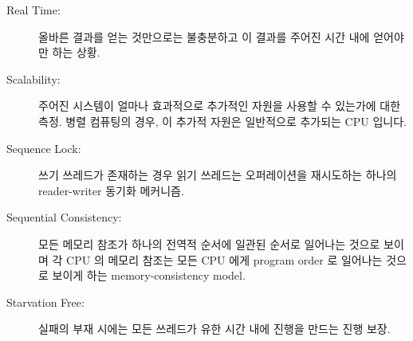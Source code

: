 \begin{description}
\fi

\item[Real Time:]
	올바른 결과를 얻는 것만으로는 불충분하고 이 결과를 주어진 시간 내에
	얻어야만 하는 상황.
\item[Scalability:]
	주어진 시스템이 얼마나 효과적으로 추가적인 자원을 사용할 수 있는가에
	대한 측정.
	병렬 컴퓨팅의 경우, 이 추가적 자원은 일반적으로 추가되는 CPU 입니다.
\item[Sequence Lock:]
	쓰기 쓰레드가 존재하는 경우 읽기 쓰레드는 오퍼레이션을 재시도하는
	하나의 reader-writer 동기화 메커니즘.
\item[Sequential Consistency:]
	모든 메모리 참조가 하나의 전역적 순서에 일관된 순서로 일어나는 것으로
	보이며 각 CPU 의 메모리 참조는 모든 CPU 에게 program order 로 일어나는
	것으로 보이게 하는 memory-consistency model.
\item[Starvation Free:]
	실패의 부재 시에는 모든 쓰레드가 유한 시간 내에 진행을 만드는 진행
	보장.

\iffalse

\item[Real Time:]\index{Real time}
	A situation in which getting the correct result is not sufficient,
	but where this result must also be obtained within a given amount
	of time.
\item[Scalability:]\index{Scalability}
	A measure of how effectively a given system is able to utilize
	additional resources.
	For parallel computing, the additional resources are usually
	additional CPUs.
\item[Sequence Lock:]\index{Sequence lock}
	A reader-writer synchronization mechanism in which readers
	retry their operations if a writer was present.
\item[Sequential Consistency:]\index{Sequential consistency}
	A memory-consistency model where all memory references appear to occur
	in an order consistent with
	a single global order, and where each CPU's memory references
	appear to all CPUs to occur in program order.
\item[Starvation Free:]\index{Starvation free}
	A forward-progress guarantee in which, in the absence of
	failures, every thread makes progress within a finite
	period of time.

\fi


\end{description}
